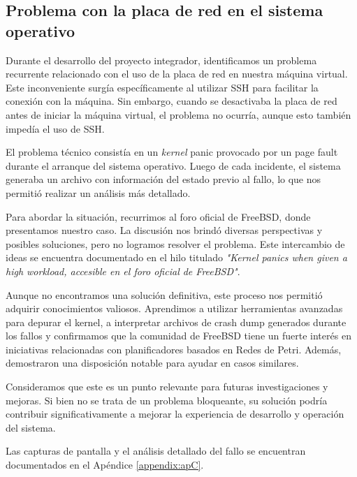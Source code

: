 


\subsection{Problema con la placa de red en el sistema operativo}\label{ch:problema_red}

Durante el desarrollo del proyecto integrador, identificamos un problema recurrente relacionado con el uso de la placa de red en nuestra máquina virtual. Este inconveniente surgía específicamente al utilizar SSH para facilitar la conexión con la máquina. Sin embargo, cuando se desactivaba la placa de red antes de iniciar la máquina virtual, el problema no ocurría, aunque esto también impedía el uso de SSH.\par

El problema técnico consistía en un \textit{kernel} panic provocado por un page fault durante el arranque del sistema operativo. Luego de cada incidente, el sistema generaba un archivo con información del estado previo al fallo, lo que nos permitió realizar un análisis más detallado.\par

Para abordar la situación, recurrimos al foro oficial de FreeBSD, donde presentamos nuestro caso. La discusión nos brindó diversas perspectivas y posibles soluciones, pero no logramos resolver el problema. Este intercambio de ideas se encuentra documentado en el hilo titulado \emph{"Kernel panics when given a high workload, accesible en el foro oficial de FreeBSD"}\cite{bib6}.\par

Aunque no encontramos una solución definitiva, este proceso nos permitió adquirir conocimientos valiosos. Aprendimos a utilizar herramientas avanzadas para depurar el kernel, a interpretar archivos de crash dump generados durante los fallos y confirmamos que la comunidad de FreeBSD tiene un fuerte interés en iniciativas relacionadas con planificadores basados en Redes de Petri. Además, demostraron una disposición notable para ayudar en casos similares.\par

Consideramos que este es un punto relevante para futuras investigaciones y mejoras. Si bien no se trata de un problema bloqueante, su solución podría contribuir significativamente a mejorar la experiencia de desarrollo y operación del sistema.\par

Las capturas de pantalla y el análisis detallado del fallo se encuentran documentados en el Apéndice \ref{appendix:apC}.\par